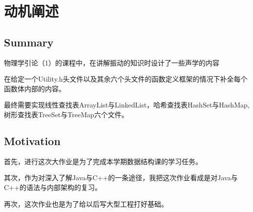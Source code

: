 \chapter{动机阐述}
\section{Summary}
物理学引论（1）的课程中，在讲解振动的知识时设计了一些声学的内容
\par
在给定一个Utility.h头文件以及其余六个头文件的函数定义框架的情况下补全每个函数体内部的内容。
\par
最终需要实现线性查找表ArrayList与LinkedList，哈希查找表HashSet与HashMap,树形查找表TreeSet与TreeMap六个文件。
\section{Motivation}
首先，进行这次大作业是为了完成本学期数据结构课的学习任务。
\par
其次，作为对深入了解Java与C++的一条途径，我把这次作业看成是对Java与C++的语法与内部架构的复习。
\par
再次，这次作业也是为了给以后写大型工程打好基础。
